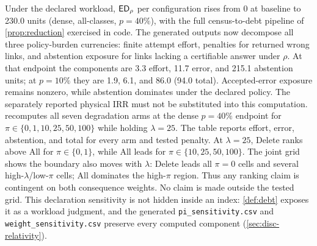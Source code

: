 \begin{table}[t]
\centering
\caption{Consequence-Weight Sensitivity of $\ED_\rho$ (Dense Profile,
$p{=}40\%$, Mean over 20 Seeds). Top: Representative $\pi$ Slices at
$\lambda{=}25$; Each Cell Is Effort/Error/Abstention/Total with Descending Rank.
Bottom: Highest-Debt Arm and Total on the Joint $\lambda/\pi$ Grid. The Complete
Six-Slice Table and All 175 Arm-Level Grid Rows Are in the Artifact.}
\label{tab:pi-sensitivity}
\footnotesize

\par\vspace{4pt}

\end{table}

\begin{finding}
\label{fnd:ed}
Under the declared workload, $\ED_\rho$ per configuration rises from 0 at baseline
to 230.0 units (dense, all-classes, $p{=}40\%$), with the full census-to-debt
pipeline of \cref{prop:reduction} exercised in code. The generated outputs now
decompose all three policy-burden currencies: finite attempt effort, penalties for returned
wrong links, and abstention exposure for links lacking a certifiable answer under
$\rho$. At that endpoint the components are 3.3 effort, 11.7 error, and 215.1 abstention
units; at $p{=}10\%$ they are 1.9, 6.1, and 86.0 (94.0 total). Accepted-error
exposure remains nonzero, while abstention dominates under the declared policy.
The separately reported physical IRR must not be substituted into this computation.
 recomputes all seven degradation arms at the dense
$p{=}40\%$ endpoint for $\pi\in\{0,1,10,25,50,100\}$ while holding
$\lambda{=}25$. The table reports effort, error, abstention, and total for every
arm and tested penalty. At $\lambda=25$, Delete ranks above All for
$\pi\in\{0,1\}$, while All leads for $\pi\in\{10,25,50,100\}$.
The joint grid shows the boundary also moves with $\lambda$: Delete leads all
$\pi=0$ cells and several high-$\lambda$/low-$\pi$ cells; All dominates the
high-$\pi$ region. Thus any ranking claim is contingent on both consequence
weights. No claim is made outside the tested grid. This declaration sensitivity
is not hidden inside an index:
\cref{def:debt} exposes it as a workload judgment, and the generated
\texttt{pi\_sensitivity.csv} and \texttt{weight\_sensitivity.csv} preserve every computed component
(\cref{sec:disc-relativity}).
\end{finding}

